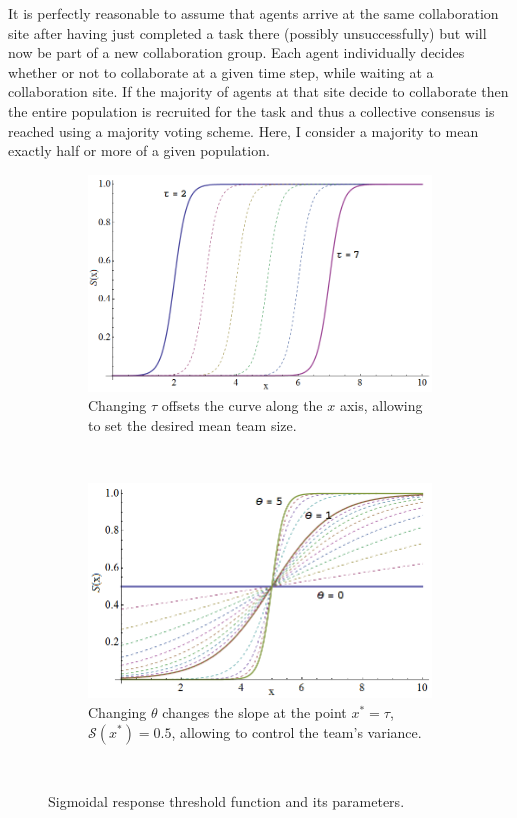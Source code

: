 \documentclass[defaultstyle,12pt]{proposal}
\def\sig{\mathcal{S}} %
\begin{document}
It is perfectly reasonable to assume that agents arrive at the same collaboration site after having just completed a task there (possibly unsuccessfully) but will now be part of a new collaboration group. Each agent individually decides whether or not to collaborate at a given time step, while waiting at a collaboration site. If the majority of agents at that site decide to collaborate then the entire population is recruited for the task and thus a collective consensus is reached using a majority voting scheme. Here, I consider a majority to mean exactly half or more of a given population. 

\begin{figure}[!htb]
\centering\begin{subfigure}{.5\textwidth}
\centering\includegraphics[width=\textwidth]{../assets/sigmoid2.png}
\caption{Changing $\tau$ offsets the curve along the $x$ axis, allowing to set the desired mean team size.}\label{}
\end{subfigure}~
\centering\begin{subfigure}{.5\textwidth}
\centering\includegraphics[width=\textwidth]{../assets/sigmoid1.png}
\caption{Changing $\theta$ changes the slope at the point $x^* = \tau$, $\sig(x^*) = 0.5$, allowing to control the team's variance.}\label{}
\end{subfigure}~
\caption{Sigmoidal response threshold function and its parameters.}\label{fig:sig}
\end{figure}
\end{document}
